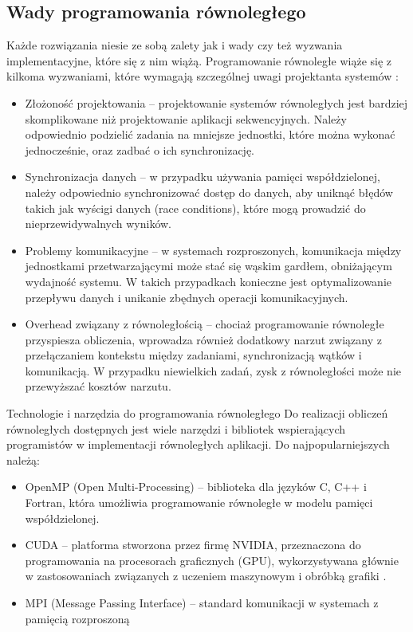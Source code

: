 \subsection{Wady programowania równoległego}
Każde rozwiązania niesie ze sobą zalety jak i wady czy też wyzwania implementacyjne, które się z nim wiążą. Programowanie równoległe wiąże się z kilkoma wyzwaniami, które wymagają szczególnej uwagi projektanta systemów \cite{ParallelProgramming, CUDA}:
\begin{itemize}
    \item Złożoność projektowania – projektowanie systemów równoległych jest bardziej skomplikowane niż projektowanie aplikacji sekwencyjnych. Należy odpowiednio podzielić zadania na mniejsze jednostki, które można wykonać jednocześnie, oraz zadbać o ich synchronizację.
    \item Synchronizacja danych – w przypadku używania pamięci współdzielonej, należy odpowiednio synchronizować dostęp do danych, aby uniknąć błędów takich jak wyścigi danych (race conditions), które mogą prowadzić do nieprzewidywalnych wyników.
    \item Problemy komunikacyjne – w systemach rozproszonych, komunikacja między jednostkami przetwarzającymi może stać się wąskim gardłem, obniżającym wydajność systemu. W takich przypadkach konieczne jest optymalizowanie przepływu danych i unikanie zbędnych operacji komunikacyjnych.
    \item Overhead związany z równoległością – chociaż programowanie równoległe przyspiesza obliczenia, wprowadza również dodatkowy narzut związany z przełączaniem kontekstu między zadaniami, synchronizacją wątków i komunikacją. W przypadku niewielkich zadań, zysk z równoległości może nie przewyższać kosztów narzutu.
\end{itemize}



Technologie i narzędzia do programowania równoległego
Do realizacji obliczeń równoległych dostępnych jest wiele narzędzi i bibliotek wspierających programistów w implementacji równoległych aplikacji. Do najpopularniejszych należą:
\begin{itemize}
    \item OpenMP (Open Multi-Processing) – biblioteka dla języków C, C++ i Fortran, która umożliwia programowanie równoległe w modelu pamięci współdzielonej. \cite{ParallelProgramminginC++withOpenMP, ProgramminInOpenMp}
    \item CUDA – platforma stworzona przez firmę NVIDIA, przeznaczona do programowania na procesorach graficznych (GPU), wykorzystywana głównie w zastosowaniach związanych z uczeniem maszynowym i obróbką grafiki \cite{CUDA}.
    \item MPI (Message Passing Interface) – standard komunikacji w systemach z pamięcią rozproszoną
\end{itemize}




